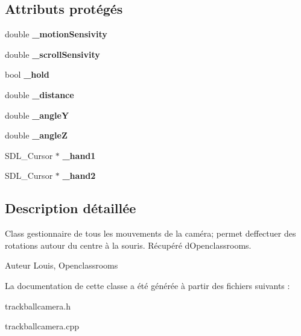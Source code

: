 \subsection*{Attributs protégés}
\begin{DoxyCompactItemize}
\item 
\mbox{\label{class_track_ball_camera_a097812817ed3ec665c76a38f71d8e133}} 
double {\bfseries \+\_\+motion\+Sensivity}
\item 
\mbox{\label{class_track_ball_camera_ac24ec13cfb6134d7e064ba1052f08e23}} 
double {\bfseries \+\_\+scroll\+Sensivity}
\item 
\mbox{\label{class_track_ball_camera_a266fb5bce739065590ea94af85f6db96}} 
bool {\bfseries \+\_\+hold}
\item 
\mbox{\label{class_track_ball_camera_aeceb35b6b038fa4f756e5098b37ef9f4}} 
double {\bfseries \+\_\+distance}
\item 
\mbox{\label{class_track_ball_camera_ad126b1c4d4e9e6bd8942015e7a19ebcc}} 
double {\bfseries \+\_\+angleY}
\item 
\mbox{\label{class_track_ball_camera_a785783601aa752acffad8c227a486271}} 
double {\bfseries \+\_\+angleZ}
\item 
\mbox{\label{class_track_ball_camera_ae9e9a83186de591c76ff43c7a1222d2b}} 
S\+D\+L\+\_\+\+Cursor $\ast$ {\bfseries \+\_\+hand1}
\item 
\mbox{\label{class_track_ball_camera_a3cf8251a5a65b3cf5b93ddbf811d165c}} 
S\+D\+L\+\_\+\+Cursor $\ast$ {\bfseries \+\_\+hand2}
\end{DoxyCompactItemize}


\subsection{Description détaillée}
Class gestionnaire de tous les mouvements de la caméra; permet d\textquotesingle{}effectuer des rotations autour du centre à la souris. Récupéré d\textquotesingle{}Openclassrooms. \begin{DoxyAuthor}{Auteur}
Louis, Openclassrooms 
\end{DoxyAuthor}


La documentation de cette classe a été générée à partir des fichiers suivants \+:\begin{DoxyCompactItemize}
\item 
trackballcamera.\+h\item 
trackballcamera.\+cpp\end{DoxyCompactItemize}
